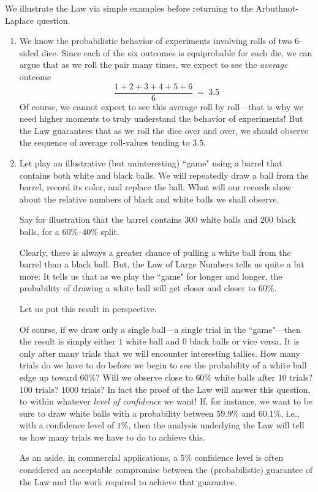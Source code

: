 \medskip

We illustrate the Law via simple examples before returning to the Arbuthnot-Laplace question.

\begin{enumerate}
\item
We know the probabilistic behavior of experiments involving rolls of two $6$-sided dice.  Since each of the six outcomes is equiprobable for each die, we can argue that as we roll the pair many times, we expect to see the {\em average} outcome
\[ \frac{1+2+3+4+5+6}{6} \ = \ 3.5 \]
Of course, we cannot expect to see this average roll by roll---that is why we need higher moments to truly understand the behavior of experiments!  But the Law guarantees that as we roll the dice over and over, we should observe the sequence of average roll-values tending to $3.5$.

\medskip\item
Let play an illustrative (but uninteresting) ``game" using a barrel that contains both white and black balls.  We will repeatedly draw a ball from the barrel, record its color, and replace the ball.  What will our records show about the relative numbers of black and white balls we shall observe.

\smallskip

Say for illustration that the barrel contains 300 white balls and 200 black balls, for a $60\%$--$40\%$ split.

\smallskip

Clearly, there is always a greater chance of pulling a white ball from the barrel than a black ball.  But, the Law of Large Numbers tells us quite a bit more:  It tells us that as we play the ``game" for longer and longer, the probability of drawing a white ball will get closer and closer to $60\%$.

\medskip

Let us put this result in perspective.

\smallskip

Of course, if we draw only a single ball---a single trial in the ``game"---then the result is simply either $1$ white ball and $0$ black balls or vice versa.  It is only after many trials that we will encounter interesting tallies. How many trials do we have to do before we begin to see the probability of a white ball edge up toward $60\%$?  Will we observe close to $60\%$ white balls after $10$ trials? $100$ trials? $1000$ trials?  In fact the proof of the Law will answer this question, to within whatever {\it level of confidence} we want!  If, for instance, we want to be sure to draw white balls with a probability between $59.9\%$ and $60.1\%$, i.e., with a confidence level of $1\%$, then the analysis underlying the Law will tell us how many trials we have to do to achieve this.

\smallskip

As an aside, in commercial applications, a $5\%$ confidence level is often considered an acceptable compromise between the (probabilistic) guarantee of the Law and the work required to achieve that guarantee.
\end{enumerate}

